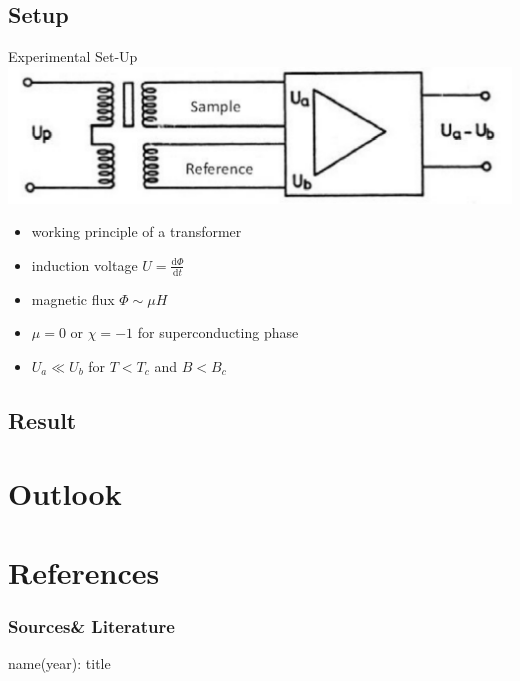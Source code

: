 \documentclass{beamer}
\begin{document}
\subsection{Setup} %
\begin{frame}{Experimental Set-Up}
\includegraphics[height=0.2\textheight]{img/detail.pdf}
\begin{itemize}[<+->]
\item working principle of a transformer
\item induction voltage $U = \frac{\mathrm{d}\Phi}{\mathrm d t} $
\item magnetic flux $\Phi \sim \mu H$
\item $\mu=0$ or $\chi=-1$ for superconducting phase
\item $U_a \ll U_b$ for $T<T_c$ and $B<B_c$

\end{itemize}



\end{frame}









\subsection{Result} %

\section{Outlook} %


\section[Sources]{References}
\begin{frame} \frametitle{Sources\& Literature}
\begin{thebibliography}{9}
  {name(year): title} 
\end{thebibliography}
\end{frame}
\end{document}
